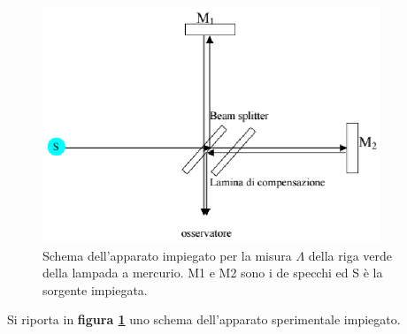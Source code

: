 \begin{figure} [!h]
	\centering
	\includegraphics[width=0.9\textwidth]{./pictures/immagine2}
	\caption{Schema dell'apparato impiegato per la misura $\Lambda$ della riga verde della lampada a mercurio.
	M1 e M2 sono i de specchi ed S è la sorgente impiegata.}
	\label{fig:schema_appar2}
\end{figure}
Si riporta in \textbf{figura \ref{fig:schema_appar2} }uno schema dell'apparato sperimentale impiegato. 